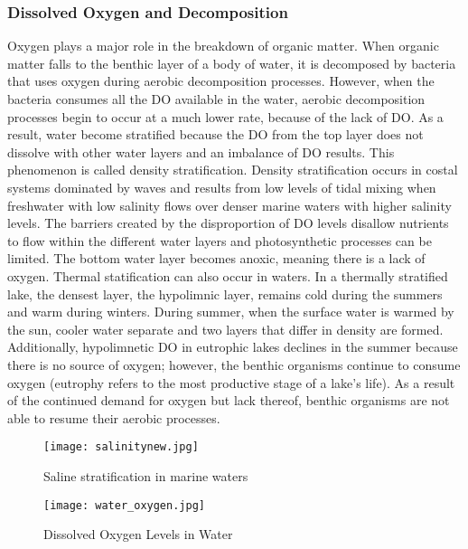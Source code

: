 \subsubsection{Dissolved Oxygen and Decomposition}
Oxygen plays a major role in the breakdown of organic matter. When organic matter falls to the benthic layer of a body of water, it is decomposed by bacteria that uses oxygen during aerobic decomposition processes. However, when the bacteria consumes all the DO available in the water, aerobic decomposition processes begin to occur at a much lower rate, because of the lack of DO. As a result, water become stratified because the DO from the top layer does not dissolve with other water layers and an imbalance of DO results. This phenomenon is called density stratification. Density stratification occurs in costal systems dominated by waves and results from low levels of tidal mixing when freshwater with low salinity flows over denser marine waters with higher salinity levels. The barriers created by the disproportion of DO levels disallow nutrients to flow within the different water layers and photosynthetic processes can be limited. The bottom water layer becomes anoxic, meaning there is a lack of oxygen. Thermal statification can also occur in waters. In a thermally stratified lake, the densest layer, the hypolimnic layer, remains cold during the summers and warm during winters. During summer, when the surface water is warmed by the sun, cooler water separate and two layers that differ in density are formed. Additionally, hypolimnetic DO in eutrophic lakes declines in the summer because there is no source of oxygen; however, the benthic organisms continue to consume oxygen (eutrophy refers to the most productive stage of a lake's life). As a result of the continued demand for oxygen but lack thereof, benthic organisms are not able to resume their aerobic processes. 


\begin{figure}[!ht]
        \centering
        \texttt{[image: salinitynew.jpg]}
        \caption{Saline stratification in marine waters}
        \label{fig:Salinity}
\end{figure}


\begin{figure}[!ht]
        \centering
        \texttt{[image: water\_oxygen.jpg]}
        \caption{Dissolved Oxygen Levels in Water}
        \label{fig:DO Levels}
\end{figure}

